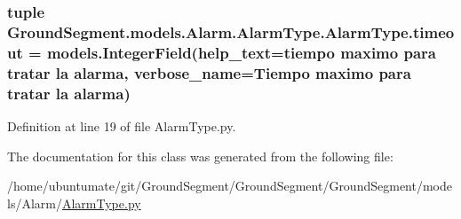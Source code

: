\hypertarget{class_ground_segment_1_1models_1_1_alarm_1_1_alarm_type_1_1_alarm_type_a331f064523fd857e0f7ad512d9c509d7}{}
\subsubsection[{timeout}]{\setlength{\rightskip}{0pt plus 5cm}tuple Ground\+Segment.\+models.\+Alarm.\+Alarm\+Type.\+Alarm\+Type.\+timeout = models.\+Integer\+Field(help\+\_\+text=\textquotesingle{}tiempo maximo para tratar la alarma\textquotesingle{}, verbose\+\_\+name=\textquotesingle{}Tiempo maximo para tratar la alarma\textquotesingle{})\hspace{0.3cm}{\ttfamily [static]}}\label{class_ground_segment_1_1models_1_1_alarm_1_1_alarm_type_1_1_alarm_type_a331f064523fd857e0f7ad512d9c509d7}


Definition at line 19 of file Alarm\+Type.\+py.



The documentation for this class was generated from the following file\+:\begin{DoxyCompactItemize}
\item 
/home/ubuntumate/git/\+Ground\+Segment/\+Ground\+Segment/\+Ground\+Segment/models/\+Alarm/\hyperlink{_alarm_type_8py}{Alarm\+Type.\+py}\end{DoxyCompactItemize}
